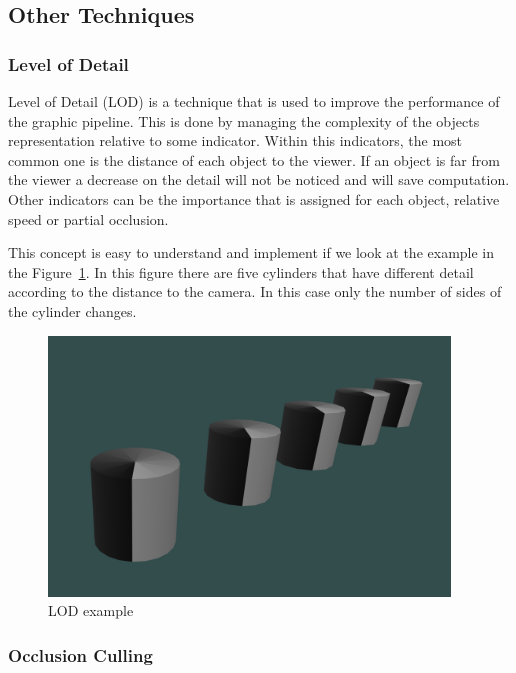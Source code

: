 

\subsection{Other Techniques} %
\label{sub:other_techniques}

\subsubsection{Level of Detail} %
\label{ssub:level_of_detail}

Level of Detail (LOD) is a technique that is used to improve the performance of the graphic pipeline. This is done by managing the complexity of the objects representation relative to some indicator.
Within this indicators, the most common one is the distance of each object to the viewer. If an object is far from the viewer a decrease on the detail will not be noticed and will save computation. Other indicators can be the importance that is assigned for each object, relative speed or partial occlusion.

This concept is easy to understand and implement if we look at the example in the Figure~\ref{fig:LOD2}. In this figure there are five cylinders that have different detail according to the distance to the camera. In this case only the number of sides of the cylinder changes.

\begin{figure}[htbp]
	\centering
	\includegraphics[width=0.95\textwidth]{img/OpenGL/LOD2.png}
	\caption{LOD example}
	\label{fig:LOD2}
\end{figure}

\subsubsection{Occlusion Culling} %
\label{ssub:occlusion_culling}

